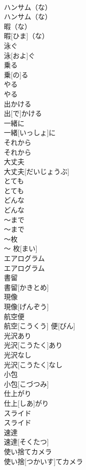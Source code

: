 \documentclass[8pt]{extreport}
\begin{document}
\begin{CJK}{UTF8}{min}
\\	ハンサム（な）	
\\	ハンサム（な）
\\	暇（な）	
\\	暇[ひま]（な）
\\	泳ぐ	
\\	泳[およ]ぐ
\\	乗る	
\\	乗[の]る
\\	やる	
\\	やる
\\	出かける	
\\	出[で]かける
\\	一緒に	
\\	一緒[いっしょ]に
\\	それから	
\\	それから
\\	大丈夫	
\\	大丈夫[だいじょうぶ]
\\	とても	
\\	とても
\\	どんな	
\\	どんな
\\	〜まで	
\\	〜まで
\\	〜枚	
\\	〜 枚[まい]
\\	エアログラム	
\\	エアログラム
\\	書留	
\\	書留[かきとめ]
\\	現像	
\\	現像[げんぞう]
\\	航空便	
\\	航空[こうくう] 便[びん]
\\	光沢あり	
\\	光沢[こうたく]あり
\\	光沢なし	
\\	光沢[こうたく]なし
\\	小包	
\\	小包[こづつみ]
\\	仕上がり	
\\	仕上[しあ]がり
\\	スライド	
\\	スライド
\\	速達	
\\	速達[そくたつ]
\\	使い捨てカメラ	
\\	使い捨[つかいす]てカメラ

\end{CJK}
\end{document}
